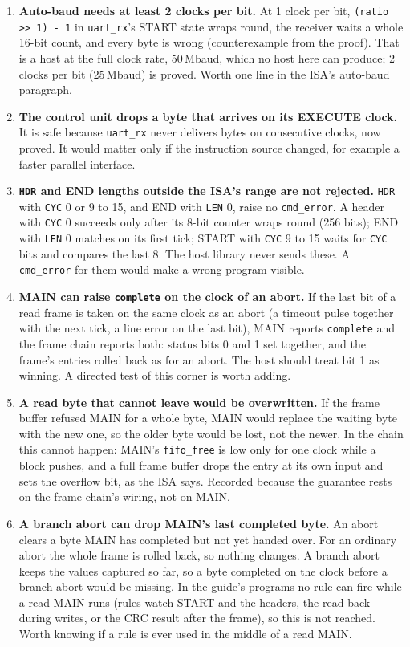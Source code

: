 \documentclass[11pt,a4paper]{article}
\newcommand{\sig}[1]{\texttt{#1}}
\begin{document}
\begin{enumerate}
\item \textbf{Auto-baud needs at least 2 clocks per bit.} At 1 clock per bit, \sig{(ratio >> 1) - 1} in \sig{uart\_rx}'s START state wraps round, the receiver waits a whole 16-bit count, and every byte is wrong (counterexample from the proof). That is a host at the full clock rate, 50\,Mbaud, which no host here can produce; 2 clocks per bit (25\,Mbaud) is proved. Worth one line in the ISA's auto-baud paragraph.
\item \textbf{The control unit drops a byte that arrives on its EXECUTE clock.} It is safe because \sig{uart\_rx} never delivers bytes on consecutive clocks, now proved. It would matter only if the instruction source changed, for example a faster parallel interface.
\item \textbf{\sig{HDR} and END lengths outside the ISA's range are not rejected.} \sig{HDR} with \sig{CYC} 0 or 9 to 15, and END with \sig{LEN} 0, raise no \sig{cmd\_error}. A header with \sig{CYC} 0 succeeds only after its 8-bit counter wraps round (256 bits); END with \sig{LEN} 0 matches on its first tick; START with \sig{CYC} 9 to 15 waits for \sig{CYC} bits and compares the last 8. The host library never sends these. A \sig{cmd\_error} for them would make a wrong program visible.
\item \textbf{MAIN can raise \sig{complete} on the clock of an abort.} If the last bit of a read frame is taken on the same clock as an abort (a timeout pulse together with the next tick, a line error on the last bit), MAIN reports \sig{complete} and the frame chain reports both: status bits 0 and 1 set together, and the frame's entries rolled back as for an abort. The host should treat bit 1 as winning. A directed test of this corner is worth adding.
\item \textbf{A read byte that cannot leave would be overwritten.} If the frame buffer refused MAIN for a whole byte, MAIN would replace the waiting byte with the new one, so the older byte would be lost, not the newer. In the chain this cannot happen: MAIN's \sig{fifo\_free} is low only for one clock while a block pushes, and a full frame buffer drops the entry at its own input and sets the overflow bit, as the ISA says. Recorded because the guarantee rests on the frame chain's wiring, not on MAIN.
\item \textbf{A branch abort can drop MAIN's last completed byte.} An abort clears a byte MAIN has completed but not yet handed over. For an ordinary abort the whole frame is rolled back, so nothing changes. A branch abort keeps the values captured so far, so a byte completed on the clock before a branch abort would be missing. In the guide's programs no rule can fire while a read MAIN runs (rules watch START and the headers, the read-back during writes, or the CRC result after the frame), so this is not reached. Worth knowing if a rule is ever used in the middle of a read MAIN.

\end{enumerate}
\end{document}
